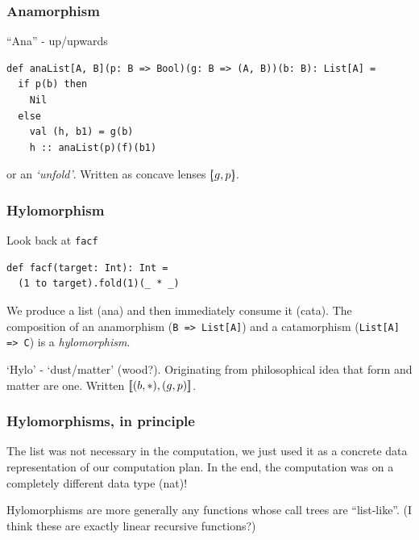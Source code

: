 \documentclass[
  aspectratio=1610, 
  xcolor={dvipsnames},
]{beamer}
\begin{document}
\begin{frame}[fragile]
  \frametitle{Anamorphism}

  ``Ana'' - up/upwards \vspace{3em}

  \pause

  \begin{lstlisting}
def anaList[A, B](p: B => Bool)(g: B => (A, B))(b: B): List[A] =
  if p(b) then 
    Nil 
  else
    val (h, b1) = g(b)
    h :: anaList(p)(f)(b1)
  \end{lstlisting}

  or an \emph{`unfold'}. Written as concave lenses \([\mspace{-5mu}(g, p)\mspace{-5mu}]\).


\end{frame}


\begin{frame}[fragile]
  \frametitle{Hylomorphism}

  Look back at \lstinline|facf|

\begin{lstlisting}
def facf(target: Int): Int = 
  (1 to target).fold(1)(_ * _)
\end{lstlisting}

  \pause We produce a list (ana) and then immediately consume it (cata). \pause
  The composition of an anamorphism (\lstinline|B => List[A]|) and a catamorphism
  (\lstinline|List[A] => C|) is a \emph{hylomorphism}.

  \pause
  `Hylo' - `dust/matter' (wood?). Originating from philosophical idea that form and
  matter are one. Written \([\mspace{-3mu}[(b, *), (g, p)]\mspace{-3mu}]\).

\end{frame}


\begin{frame}
  \frametitle{Hylomorphisms, in principle}

  The list was not necessary in the computation, we just used it as a concrete
  data representation of our computation plan. \pause In the end, the
  computation was on a completely different data type (nat)! \pause
  
  Hylomorphisms are more generally any functions whose call trees are
  ``list-like''. \pause (I think these are exactly linear recursive functions?)

\end{frame}
\end{document}
